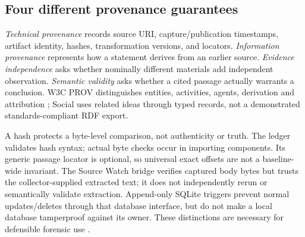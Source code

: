 \subsection{Four different provenance guarantees}
\emph{Technical provenance} records source URI, capture/publication timestamps, artifact identity, hashes, transformation versions, and locators. \emph{Information provenance} represents how a statement derives from an earlier source. \emph{Evidence independence} asks whether nominally different materials add independent observation. \emph{Semantic validity} asks whether a cited passage actually warrants a conclusion. W3C PROV distinguishes entities, activities, agents, derivation and attribution \citep{lebo2013provo,moreau2013provdm}; Social uses related ideas through typed records, not a demonstrated standards-compliant RDF export.

A hash protects a byte-level comparison, not authenticity or truth. The ledger validates hash syntax; actual byte checks occur in importing components. Its generic passage locator is optional, so universal exact offsets are not a baseline-wide invariant. The Source Watch bridge verifies captured body bytes but trusts the collector-supplied extracted text; it does not independently rerun or semantically validate extraction. Append-only SQLite triggers prevent normal updates/deletes through that database interface, but do not make a local database tamperproof against its owner. These distinctions are necessary for defensible forensic use \citep{berkeleyProtocol2022}.
